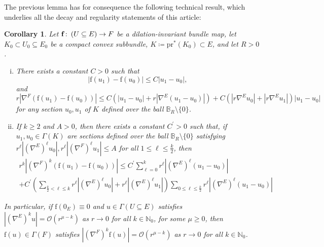 \documentclass{article}
\numberwithin{equation}{section}        %
\theoremstyle{bfnote}
\newtheorem{cor}[thm]{Corollary}            %
\theoremstyle{definition}
\theoremstyle{bfremark}
\newcommand{\col}{\colon \thinspace}        %
\newcommand{\N}{\mathbb{N}}                 %
\newcommand{\Ball}{\mathbb{B}}              %
\newcommand{\pr}{\mathrm{pr}}               %
\newcommand{\bmap}[1]{\boldsymbol{\mathrm{#1}}}     %
\begin{document}
The previous lemma has for consequence the following technical result, which underlies all the decay and regularity statements of this article:

\begin{cor}     \label{cor: Estimates on derivatives for dilation-invariant maps}
    Let $\bmap{f} \col (U \subseteq E) \to F$ be a dilation-invariant bundle map, let $K_0 \subset U_0 \subseteq E_0$ be a compact convex subbundle, $K \coloneqq \pr^*(K_0) \subset E$, and let $R > 0$. 
    \begin{enumerate}[(i)]
        \item There exists a constant $C > 0$ such that
        \begin{equation*}
            |\bmap{f}(u_1)- \bmap{f}(u_0)| \leq C |u_1-u_0|,
        \end{equation*}
        and
        \begin{equation*}
        	r |\nabla^F(\bmap{f}(u_1)- \bmap{f}(u_0))| \leq C (|u_1-u_0| + r |\nabla^E(u_1-u_0)|) + C (|r\nabla^E u_0| + |r\nabla^E u_1|) |u_1-u_0| 
		\end{equation*}
        for any section $u_0,u_1$ of $K$ defined over the ball $\Ball_R \setminus \{0\}$.

        \item If $k \geq 2$ and $A > 0$, then there exists a constant $C^\prime > 0$ such that, if $u_1,u_0 \in \Gamma(K)$ are sections defined over the ball $\Ball_R \setminus \{0\}$ satisfying $r^\ell|(\nabla^{E})^\ell u_0|, r^\ell |(\nabla^F)^\ell u_1| \leq A$ for all $1 \leq \ell \leq \frac{k}{2}$, then
        \begin{multline*}
            r^k|(\nabla^F)^k (\bmap{f}(u_1) - \bmap{f}(u_0)) | \leq C^\prime \sum_{\ell = 0}^k r^{\ell} |(\nabla^E)^\ell (u_1-u_0)| \\ + C^\prime \left( \sum_{\frac{k}{2} < \ell \leq k} r^\ell|(\nabla^E)^\ell u_0| + r^\ell |(\nabla^E)^\ell u_1| \right) \sum_{0 \leq \ell \leq \frac{k}{2}} r^\ell |(\nabla^E)^\ell(u_1-u_0)|
        \end{multline*}
    \end{enumerate}
    In particular, if $\bmap{f}(0_E) \equiv 0$ and $u \in \Gamma(U \subseteq E)$ satisfies $|(\nabla^E)^k u | = \mathcal{O}(r^{\mu-k})$ as $r \to 0$ for all $k \in \N_0$, for some $\mu \geq 0$, then $\bmap{f}(u) \in \Gamma(F)$ satisfies $|(\nabla^F)^k \bmap{f}(u) | = \mathcal{O}(r^{\mu-k})$ as $r \to 0$ for all $k \in \N_0$.
\end{cor}
\end{document}
